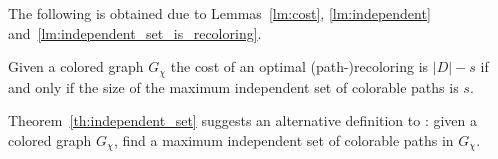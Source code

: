 The following is obtained due to  Lemmas~\ref{lm:cost}, 
\ref{lm:independent} and~\ref{lm:independent_set_is_recoloring}.

\begin{theorem}
\label{th:independent_set}
Given a colored graph $G_\chi$ the cost of an optimal
(path-)recoloring is $|D| - s$ if and only if the size of the maximum
independent set of colorable paths is $s$.
\end{theorem}

Theorem~\ref{th:independent_set} suggests an alternative definition to \TWOCR{}: 
given a colored graph $G_\chi$, 
find a maximum independent set of colorable paths in $G_\chi$.
